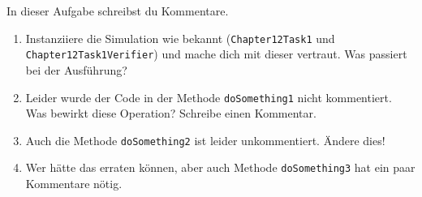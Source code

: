 

In dieser Aufgabe schreibst du Kommentare.
\begin{enumerate}                           
    \item Instanziiere die Simulation wie bekannt (\lstinline{Chapter12Task1} und \lstinline{Chapter12Task1Verifier}) und mache dich mit dieser vertraut.
        Was passiert bei der Ausführung?
    \item Leider wurde der Code in der Methode \lstinline{doSomething1} nicht kommentiert. Was bewirkt diese Operation? Schreibe einen Kommentar.
    \item Auch die Methode \lstinline{doSomething2} ist leider unkommentiert. Ändere dies!
    \item Wer hätte das erraten können, aber auch Methode \lstinline{doSomething3} hat ein paar Kommentare nötig.
\end{enumerate}
